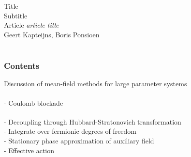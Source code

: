 \documentclass[]{beamer}
\begin{document}
\usetikzlibrary{snakes, shapes, calc}
\usetikzlibrary{mindmap,trees, matrix}

\color{white}

\begin{frame}[t]\frametitle{~}

  {\LARGE{ Title }}\\ {\large{Subtitle}}\\
  \vspace{20pt}
  {\small{Article \textit{article title }}}\\
  \vspace{60pt}
  Geert Kapteijns, Boris Ponsioen\\
  ~\\


\end{frame}

\begin{frame}[t]\frametitle{Contents}

Discussion of mean-field methods for large parameter systems \\
  ~\\
  - Coulomb blockade \\
  ~\\
  - Decoupling through Hubbard-Stratonovich transformation \\
  - Integrate over fermionic degrees of freedom \\
  - Stationary phase approximation of auxiliary field \\
  - Effective action

\end{frame}
\end{document}
